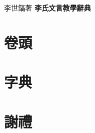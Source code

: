 \documentclass[a5paper,12pt]{ltjtbook}
\begin{document}
\begin{titlepage}
\textcolor{wh}
\hfill
\vfill
\vfill
{\fontsize{4mm}{4mm}\selectfont\textcolor{wh}{李世鎬\hspace{10mm}著}}
\vspace{24pt}\newline
{\fontsize{12mm}{12mm}\bfseries\selectfont\textcolor{wh}{\hspace{10mm}李氏文言教學辭典}}
\vspace{24pt}
\end{titlepage}
\newpage
\chapter*{卷頭}
\onehalfspacing
\flushleft

\chapter*{字典}
\onehalfspacing
\flushleft

\chapter*{謝禮}
\onehalfspacing
\flushleft

\end{document}
